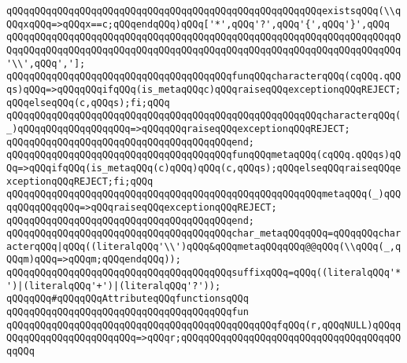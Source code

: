 \verb|qQQqqQQqqQQqqQQqqQQqqQQqqQQqqQQqqQQqqQQqqQQqqQQqqQQqqQQqexistsqQQq(\\qQQqxqQQq=>qQQqx==c;qQQqendqQQq)qQQq['*',qQQq'?',qQQq'{',qQQq'}',qQQq|\newline
\verb|qQQqqQQqqQQqqQQqqQQqqQQqqQQqqQQqqQQqqQQqqQQqqQQqqQQqqQQqqQQqqQQqqQQqqQQqqQQqqQQqqQQqqQQqqQQqqQQqqQQqqQQqqQQqqQQqqQQqqQQqqQQqqQQqqQQqqQQqqQQq'\\',qQQq','];|\newline
\newline
\verb|qQQqqQQqqQQqqQQqqQQqqQQqqQQqqQQqqQQqqQQqfunqQQqcharacterqQQq(cqQQq.qQQqs)qQQq=>qQQqqQQqifqQQq(is_metaqQQqc)qQQqraiseqQQqexceptionqQQqREJECT;qQQqelseqQQq(c,qQQqs);fi;qQQq|\newline
\verb|qQQqqQQqqQQqqQQqqQQqqQQqqQQqqQQqqQQqqQQqqQQqqQQqqQQqqQQqcharacterqQQq(_)qQQqqQQqqQQqqQQqqQQq=>qQQqqQQqraiseqQQqexceptionqQQqREJECT;|\newline
\verb|qQQqqQQqqQQqqQQqqQQqqQQqqQQqqQQqqQQqqQQqend;|\newline
\newline
\verb|qQQqqQQqqQQqqQQqqQQqqQQqqQQqqQQqqQQqqQQqfunqQQqmetaqQQq(cqQQq.qQQqs)qQQq=>qQQqifqQQq(is_metaqQQq(c)qQQq)qQQq(c,qQQqs);qQQqelseqQQqraiseqQQqexceptionqQQqREJECT;fi;qQQq|\newline
\verb|qQQqqQQqqQQqqQQqqQQqqQQqqQQqqQQqqQQqqQQqqQQqqQQqqQQqqQQqmetaqQQq(_)qQQqqQQqqQQqqQQq=>qQQqraiseqQQqexceptionqQQqREJECT;|\newline
\verb|qQQqqQQqqQQqqQQqqQQqqQQqqQQqqQQqqQQqqQQqend;|\newline
\newline
\verb|qQQqqQQqqQQqqQQqqQQqqQQqqQQqqQQqqQQqqQQqchar_metaqQQqqQQq=qQQqqQQqcharacterqQQq|\verb#|qQQq((literalqQQq'\\')qQQq&qQQqmetaqQQqqQQq@@qQQq(\\qQQq(_,qQQqm)qQQq=>qQQqm;qQQqendqQQq));#\newline
\newline
\verb|qQQqqQQqqQQqqQQqqQQqqQQqqQQqqQQqqQQqqQQqsuffixqQQq=qQQq((literalqQQq'*')|\verb#|(literalqQQq'+')|(literalqQQq'?'));#\newline
\newline
\verb|qQQqqQQq#qQQqqQQqAttributeqQQqfunctionsqQQq|\newline
\verb|qQQqqQQqqQQqqQQqqQQqqQQqqQQqqQQqqQQqqQQqfun|\newline
\verb|qQQqqQQqqQQqqQQqqQQqqQQqqQQqqQQqqQQqqQQqqQQqqQQqfqQQq(r,qQQqNULL)qQQqqQQqqQQqqQQqqQQqqQQqqQQq=>qQQqr;qQQqqQQqqQQqqQQqqQQqqQQqqQQqqQQqqQQqqQQqqQQq|\newline
